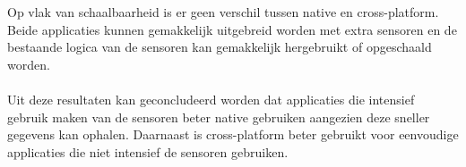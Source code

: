 \\\\
Op vlak van schaalbaarheid is er geen verschil tussen native en cross-platform. Beide applicaties kunnen
gemakkelijk uitgebreid worden met extra sensoren en de bestaande logica van de sensoren kan gemakkelijk 
hergebruikt of opgeschaald worden.
\\\\
Uit deze resultaten kan geconcludeerd worden dat applicaties die intensief gebruik maken van de sensoren 
beter native gebruiken aangezien deze sneller gegevens kan ophalen. Daarnaast is cross-platform beter gebruikt 
voor eenvoudige applicaties die niet intensief de sensoren gebruiken.















